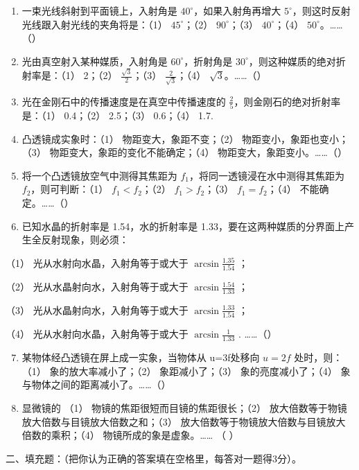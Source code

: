 \begin{enumerate}
\item
  一束光线斜射到平面镜上，入射角是 \(40^{\circ}\)，如果入射角再增大
  \(5^{\circ}\)，则这时反射光线跟入射光线的夹角将是：（1）
  \(45^{\circ}\)；（2） \(90^{\circ}\)；（3） \(40^{\circ}\)；（4）
  \(50^{\circ}\)。\ldots\ldots（）
\item
  光由真空射入某种媒质，入射角是 \(60^{\circ}\)，折射角是
  \(30^{\circ}\)，则这种媒质的绝对折射率是：（1） 2；（2）
  \(\frac{\sqrt{3}}{2}\)；（3） \(\frac{2}{\sqrt{3}}\)；（4）
  \(\sqrt{3}\)。\ldots\ldots（）
\item
  光在金刚石中的传播速度是在真空中传播速度的
  \(\frac{2}{5}\)，则金刚石的绝对折射率是：（1） 0.4；（2） 2.5；（3）
  0.6；（4） 1.7.
\item
  凸透镜成实象时：（1） 物距变大，象距不变；（2）
  物距变小，象距也变小；（3） 物距变大，象距的变化不能确定；（4）
  物距变大，象距变小。\ldots\ldots（）
\item
  将一个凸透镜放空气中测得其焦距为
  \(f_{1}\)，将同一透镜浸在水中测得其焦距为 \(f_{2}\)，则可判断：（1）
  \(f_{1} < f_{2}\)；（2） \(f_{1} > f_{2}\)；（3）
  \(f_{1} = f_{2}\)；（4） 不能确定。\ldots\ldots（）
\item
  已知水晶的折射率是 1.54，水的折射率是
  1.33，要在这两种媒质的分界面上产生全反射现象，则必须：
\end{enumerate}

（1） 光从水射向水晶，入射角等于或大于 \(\arcsin\frac{1.35}{1.54}\) ；

（2） 光从水晶射向水，入射角等于或大于 \(\arcsin\frac{1.54}{1.33}\) ；

（3） 光从水晶射向水，入射角等于或大于 \(\arcsin\frac{1.33}{1.54}\) ；

（4） 光从水射向水晶，入射角等于或大于 \(\arcsin\frac{1}{1.33}\) .
\ldots\ldots（）

\begin{enumerate}
\setcounter{enumi}{6}
\item
  某物体经凸透镜在屏上成一实象，当物体从 u=3f处移向 \(u = 2f\)
  处时，则：（1） 象的放大率减小了；（2） 象距减小了；（3）
  象的亮度减小了；（4） 象与物体之间的距离减小了。\ldots\ldots（）
\item
  显微镜的 （1） 物镜的焦距很短而目镜的焦距很长；（2）
  放大倍数等于物镜放大倍数与目镜放大倍数之和；（3）
  放大倍数等于物镜放大倍数与目镜放大倍数的乘积；（4）
  物镜所成的象是虚象。\ldots\ldots{} （ ）
\end{enumerate}

二、填充题：（把你认为正确的答案填在空格里，每答对一题得3分）。

